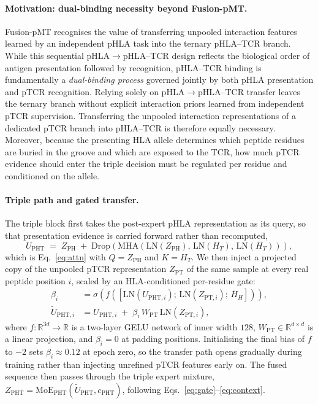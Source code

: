 \documentclass[webpdf,modern,large,namedate]{oup-authoring-template}
\theoremstyle{thmstyleone}
\theoremstyle{thmstyletwo}
\theoremstyle{thmstylethree}
\newcommand{\PH}{pHLA}
\newcommand{\PT}{pTCR}
\newcommand{\PHT}{pHLA--TCR}
\newcommand{\PHm}{\mathrm{PH}}
\newcommand{\PTm}{\mathrm{PT}}
\newcommand{\PHTm}{\mathrm{PHT}}
\newcommand{\LN}{\mathrm{LN}}
\newcommand{\MHA}{\mathrm{MHA}}
\newcommand{\dmodel}{d}
\begin{document}
\paragraph{Motivation: dual-binding necessity beyond Fusion-pMT.}
Fusion-pMT \citep{ma2025fusionpmt} recognises the value of transferring unpooled
interaction features learned by an independent \PH{} task into the ternary
\PHT{} branch. While this sequential \PH{}$\rightarrow$\PHT{} design reflects
the biological order of antigen presentation followed by recognition, \PHT{}
binding is fundamentally a \emph{dual-binding process} governed jointly by both
\PH{} presentation and \PT{} recognition. Relying solely on \PH{}$\rightarrow$\PHT{}
transfer leaves the ternary branch without explicit interaction priors learned
from independent \PT{} supervision. Transferring the unpooled interaction
representations of a dedicated \PT{} branch into \PHT{} is therefore equally
necessary. Moreover, because the presenting HLA allele determines which peptide
residues are buried in the groove and which are exposed to the TCR, how much
\PT{} evidence should enter the triple decision must be regulated per residue
and conditioned on the allele.

\paragraph{Triple path and gated transfer.}
The triple block first takes the post-expert \PH{} representation as its query,
so that presentation evidence is carried forward rather than recomputed,
\begin{equation}
U_{\PHTm} \;=\; Z_{\PHm} \;+\;
\mathrm{Drop}\!\left(\MHA\!\left(\LN(Z_{\PHm}),\,\LN(H_T),\,\LN(H_T)\right)\right),
\label{eq:pht-attn}
\end{equation}
which is Eq.~\eqref{eq:attn} with $Q=Z_{\PHm}$ and $K=H_T$. We then inject a
projected copy of the unpooled \PT{} representation $Z_{\PTm}$ of the same
sample at every real peptide position $i$, scaled by an HLA-conditioned
per-residue gate:
\begin{align}
\beta_i &= \sigma\!\left(f\!\left(\left[\LN\!\left(U_{\PHTm,i}\right);\,
\LN\!\left(Z_{\PTm,i}\right);\,\bar H_H\right]\right)\right),
\label{eq:beta}\\
\tilde U_{\PHTm,i} &= U_{\PHTm,i} \;+\; \beta_i\,W_{\PTm}\,
\LN\!\left(Z_{\PTm,i}\right),
\label{eq:fuse}
\end{align}
where $f:\mathbb{R}^{3\dmodel}\rightarrow\mathbb{R}$ is a two-layer GELU
network of inner width $128$, $W_{\PTm}\in\mathbb{R}^{\dmodel\times\dmodel}$ is
a linear projection, and $\beta_i=0$ at padding positions. Initialising the
final bias of $f$ to $-2$ sets $\beta_i\approx0.12$ at epoch zero, so the
transfer path opens gradually during training rather than injecting unrefined
\PT{} features early on. The fused sequence then passes through the triple
expert mixture, $Z_{\PHTm}=\mathrm{MoE}_{\PHTm}(\tilde U_{\PHTm}, c_{\PHTm})$,
following Eqs.~\eqref{eq:gate}--\eqref{eq:context}.
\end{document}
